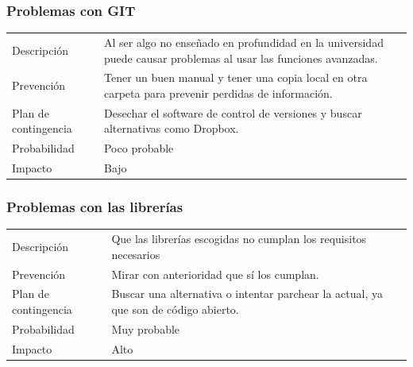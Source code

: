 \subsubsection{Problemas con GIT}
\begin{table}[H]
    \begin{center}
        \begin{tabular}{l p{8cm}}
            Descripci\'{o}n                 & Al ser algo no ense\~{n}ado en profundidad en la universidad puede causar problemas al 
            								  usar las funciones avanzadas. \\
            Prevenci\'{o}n                  & Tener un buen manual y tener una copia local en otra carpeta para prevenir perdidas de 
            								  informaci\'{o}n. \\ 
            Plan de contingencia            & Desechar el software de control de versiones y buscar alternativas como Dropbox. \\
            Probabilidad                    & Poco probable \\
            Impacto                         & Bajo \\
        \end{tabular}
    \end{center}  
\end{table}
\subsubsection{Problemas con las librer\'{i}as}
\begin{table}[H]
    \begin{center}
        \begin{tabular}{l p{8cm}}
            Descripci\'{o}n                 & Que las librer\'{i}as escogidas no cumplan los requisitos necesarios \\
            Prevenci\'{o}n                  & Mirar con anterioridad que s\'i los cumplan. \\ 
            Plan de contingencia            & Buscar una alternativa o intentar parchear la actual, ya que son de c\'{o}digo 
            								  abierto. \\
            Probabilidad                    & Muy probable \\
            Impacto                         & Alto \\
        \end{tabular}
    \end{center}
    
\end{table}
